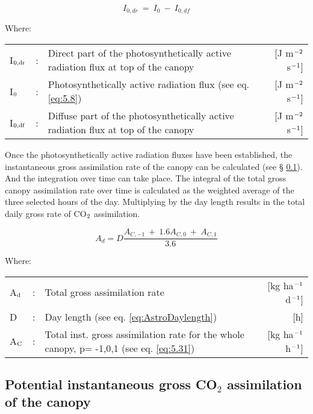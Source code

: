 \begin{equation}
I_{0,dr} ~=~ I_{0} ~-~I_{0,df} 
\end{equation}

Where:\\[5pt]
\begin{tabularx}{\textwidth}{llXr}
	I$_{{\rm 0,dr}}$ &:& Direct part of the photosynthetically active radiation flux 
	at top of the canopy    &    [J m$^{{\rm -2}}$ s$^{{\rm -1}}$]\\
	I$_{{\rm 0}}$ &:& Photosynthetically active radiation flux (see eq. \ref{eq:5.8})    &  
	[J m$^{{\rm -2}}$ s$^{{\rm -1}}$]\\
	I$_{{\rm 0,df}}$ &:& Diffuse part of the photosynthetically active radiation flux 
	at top of the canopy     &   [J m$^{{\rm -2}}$ s$^{{\rm -1}}$]\\
\end{tabularx}

Once the photosynthetically active radiation fluxes have been established, the 
instantaneous gross assimilation rate of the canopy can be calculated (see \S
\ref{sec:PotentialInstantGrossAssimilation}). And the integration over time can take place.
The integral of the total gross canopy assimilation rate over time is calculated as the
weighted average of the three selected hours of the day. Multiplying by the day length
results in the total daily gross rate of CO$_{{\rm 2}}$ assimilation. 

\begin{equation}
\label{eq:5.11}
A_{d} = D {\frac{A_{C,-1} ~+~ 1.6 A_{C,0} ~+~ A_{C,1} }{3.6}}
\end{equation}

Where:\\[5pt]
\begin{tabularx}{\textwidth}{llXr}
	A$_{{\rm d}}$ &:& Total gross assimilation rate    &    
	[kg ha$^{{\rm -1}}$ d$^{{\rm -1}}$]\\
	D &:& Day length (see eq. \ref{eq:AstroDaylength})   &     [h]\\
	A$_{{\rm C}}$ &:& Total inst. gross assimilation rate for
	the whole canopy, p= -1,0,1 (see eq. \ref{eq:5.31})    &
	[kg ha$^{{\rm -1}}$ h$^{{\rm -1}}$]\\
\end{tabularx}

\subsection{Potential instantaneous gross CO$_{2}$ assimilation of the canopy}  
\label{sec:PotentialInstantGrossAssimilation}

